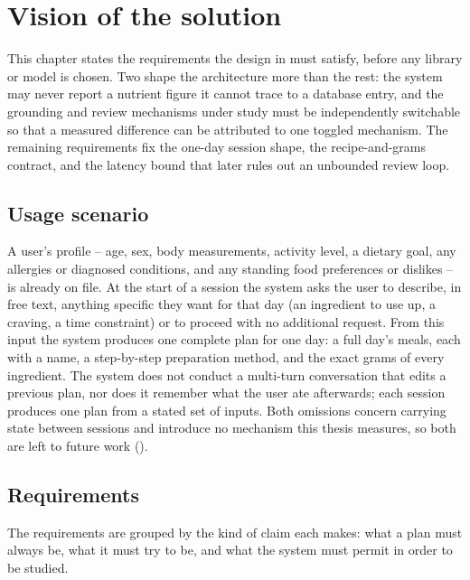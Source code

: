 \chapter{Vision of the solution}
\label{cha:vision}

This chapter states the requirements the design in  must satisfy, before any library or model is chosen. Two shape the architecture more than the rest: the system may never report a nutrient figure it cannot trace to a database entry, and the grounding and review mechanisms under study must be independently switchable so that a measured difference can be attributed to one toggled mechanism. The remaining requirements fix the one-day session shape, the recipe-and-grams contract, and the latency bound that later rules out an unbounded review loop.

\section{Usage scenario}
\label{sec:vision-usage-scenario}

A user's profile -- age, sex, body measurements, activity level, a dietary goal, any allergies or diagnosed conditions, and any standing food preferences or dislikes -- is already on file. At the start of a session the system asks the user to describe, in free text, anything specific they want for that day (an ingredient to use up, a craving, a time constraint) or to proceed with no additional request. From this input the system produces one complete plan for one day: a full day's meals, each with a name, a step-by-step preparation method, and the exact grams of every ingredient. The system does not conduct a multi-turn conversation that edits a previous plan, nor does it remember what the user ate afterwards; each session produces one plan from a stated set of inputs. Both omissions concern carrying state between sessions and introduce no mechanism this thesis measures, so both are left to future work ().

\section{Requirements}
\label{sec:vision-requirements}

The requirements are grouped by the kind of claim each makes: what a plan must always be, what it must try to be, and what the system must permit in order to be studied.

